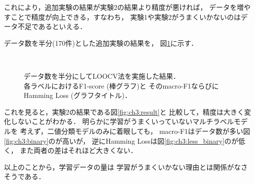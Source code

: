 これにより，追加実験の結果が実験2の結果より精度が悪ければ，
データを増やすことで精度が向上できる，すなわち，
実験1や実験2がうまくいかないのはデータ不足であるといえる．

データ数を半分(170件)とした追加実験の結果を，
図\ref{fig:ch3:result_less}に示す．

\begin{figure}[p]
  \centering
  \\
  \caption{データ数を半分にしてLOOCV法を実施した結果．\\
各ラベルにおけるF1-score (棒グラフ)と
  そのmacro-F1ならびにHamming Loss (グラフタイトル)．
 }
  \label{fig:ch3:result_less}
\end{figure}

これを見ると，実験2の結果である図\ref{fig:ch3:result}と
比較して，精度は大きく変化しないことがわかる．
明らかに学習がうまくいっていないマルチラベルモデルを
考えず，二値分類モデルのみに着眼しても，
macro-F1はデータ数が多い図\ref{fig:ch3:binary}のが高いが，
逆にHamming Lossは図\ref{fig:ch3:less_binary}のが低く，
また両者の差はそれほど大きくない．

以上のことから，学習データの量は
学習がうまくいかない理由とは関係がなさそうである．

